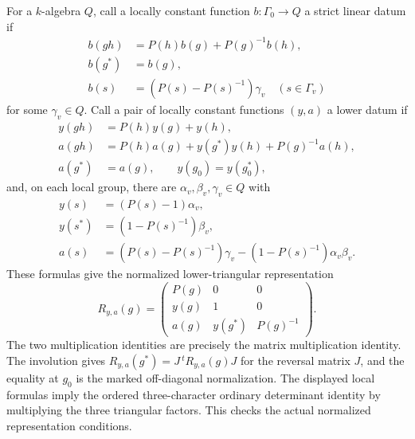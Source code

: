 For a $k$-algebra $Q$, call a locally constant function
$b:\Gamma_0\to Q$ a strict linear datum if
\[
 \begin{split}
 b(gh)&=P(h)b(g)+P(g)^{-1}b(h),\\
 b(g^*)&=b(g),\\
 b(s)&=(P(s)-P(s)^{-1})\gamma_v
                \quad(s\in\Gamma_v)
 \end{split}
\]
for some $\gamma_v\in Q$.
Call a pair of locally constant functions $(y,a)$ a lower datum if
\begin{align*}
 y(gh)&=P(h)y(g)+y(h),\\
 a(gh)&=P(h)a(g)+y(g^*)y(h)+P(g)^{-1}a(h),\\
 a(g^*)&=a(g),\qquad y(g_0)=y(g_0^*),
\end{align*}
and, on each local group, there are $\alpha_v,\beta_v,\gamma_v\in Q$
with
\[
 \begin{split}
 y(s)&=(P(s)-1)\alpha_v,\\
 y(s^*)&=(1-P(s)^{-1})\beta_v,\\
 a(s)&=(P(s)-P(s)^{-1})\gamma_v
                  -(1-P(s)^{-1})\alpha_v\beta_v.
 \end{split}
\]
These formulas give the normalized lower-triangular representation
\[
 R_{y,a}(g)=
 \begin{pmatrix}
 P(g)&0&0\\
 y(g)&1&0\\
 a(g)&y(g^*)&P(g)^{-1}
 \end{pmatrix}.
\]
The two multiplication identities are precisely the matrix
multiplication identity. The involution gives
$R_{y,a}(g^*)=J\,{}^tR_{y,a}(g)J$ for the reversal matrix $J$,
and the equality at $g_0$ is the marked off-diagonal normalization.
The displayed local formulas imply the ordered three-character
ordinary determinant identity by multiplying the three triangular
factors. This checks the actual normalized representation conditions.

